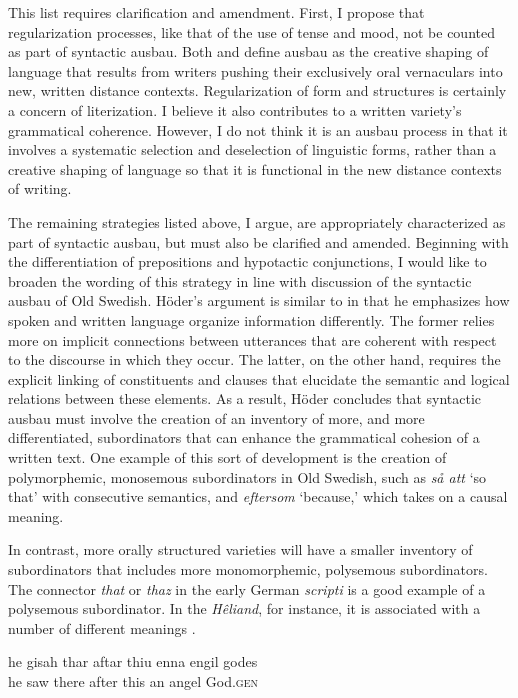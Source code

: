 \noindent This list requires clarification and amendment. First, I propose that regularization processes, like that of the use of tense and mood, not be counted as part of syntactic ausbau. Both \citet{Kloss1978} and \citet{KochOesterreicher1994} define ausbau as the creative shaping of language that results from writers pushing their exclusively oral vernaculars into new, written distance contexts. Regularization of form and structures is certainly a concern of literization. I believe it also contributes to a written variety’s grammatical coherence. However, I do not think it is an ausbau process in that it involves a systematic selection and deselection of linguistic forms, rather than a creative shaping of language so that it is functional in the new distance contexts of writing.

The remaining strategies listed above, I argue, are appropriately characterized as part of syntactic ausbau, but must also be clarified and amended. Beginning with the differentiation of prepositions and hypotactic conjunctions, I would like to broaden the wording of this strategy in line with  discussion of the syntactic ausbau of Old Swedish. Höder’s argument is similar to  in that he emphasizes how spoken and written language organize information differently. The former relies more on implicit connections between utterances that are coherent with respect to the discourse in which they occur. The latter, on the other hand, requires the explicit linking of constituents and clauses that elucidate the semantic and logical relations between these elements. As a result, Höder concludes that syntactic ausbau must involve the creation of an inventory of more, and more differentiated, subordinators that can enhance the grammatical cohesion of a written text. One example of this sort of development is the creation of polymorphemic, monosemous subordinators in Old Swedish, such as \textit{så att} ‘so that’ with consecutive semantics, and \textit{eftersom} ‘because,’ which takes on a causal meaning.

In contrast, more orally structured varieties will have a smaller inventory of subordinators that includes more monomorphemic, polysemous subordinators. The connector \textit{that} or \textit{thaz} in the early German \textit{scripti} is a good example of a polysemous subordinator. In the \textit{Hêliand}, for instance, it is associated with a number of different meanings .

\ea%
    \label{ex:4:8}
\ea
\gll he  gisah   thar    aftar thiu  enna   engil  godes\\
  he   saw    there   after this   an     angel   God.\textsc{gen}\\


